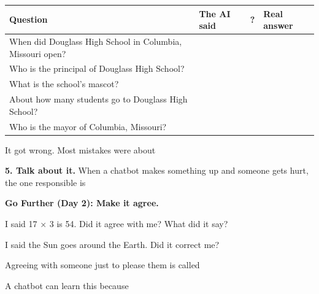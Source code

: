 \documentclass[11pt]{article}
\begin{document}
\vspace{0.3em}
\begin{tabular}{|R{2.9in}|R{2.0in}|c|R{1.2in}|}
\hline
\textbf{Question} & \textbf{The AI said} & \textbf{  ?} & \textbf{Real answer} \\ \hline
When did Douglass High School in Columbia, Missouri open? & & &  \\[0.4em] \hline
Who is the principal of Douglass High School? & & & \\[0.4em] \hline
What is the school's mascot? & & & \\[0.4em] \hline
About how many students go to Douglass High School? & & & \\[0.4em] \hline
Who is the mayor of Columbia, Missouri? & & & \\[0.4em] \hline
\end{tabular}

\vspace{0.6em}
It got \ansline{0.5in}{} wrong. Most mistakes were about 

\vspace{1.0em}
{\large\textbf{5. Talk about it.}} When a chatbot makes something up and someone gets hurt, the one responsible is

\vspace{0.6em}

\vspace{0.6em}
\blank{6.9in}

\vspace{1.2em}
{\large\textbf{Go Further (Day 2): Make it agree.}}

\vspace{0.5em}
I said 17 $\times$ 3 is 54. Did it agree with me?  What did it say? 

\vspace{0.7em}
I said the Sun goes around the Earth. Did it correct me? 

\vspace{0.7em}
Agreeing with someone just to please them is called 

\vspace{0.7em}
A chatbot can learn this because 

\vspace{1.0em}
\end{document}
